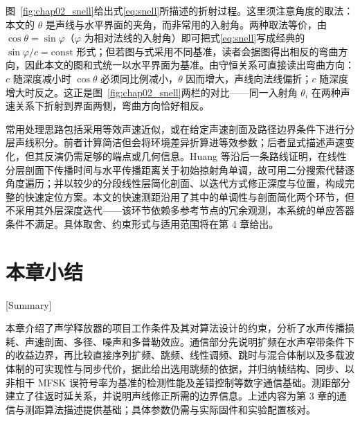 图~\ref{fig:chap02_snell}给出式\eqref{eq:snell}所描述的折射过程。这里须注意角度的取法：本文的 $\theta$ 是声线与水平界面的夹角，而非常用的入射角。两种取法等价，由 $\cos\theta=\sin\varphi$（$\varphi$ 为相对法线的入射角）即可把式\eqref{eq:snell}写成经典的 $\sin\varphi/c=\text{const}$ 形式；但若图与式采用不同基准，读者会据图得出相反的弯曲方向，因此本文的图和式统一以水平界面为基准。由守恒关系可直接读出弯曲方向：$c$ 随深度减小时 $\cos\theta$ 必须同比例减小，$\theta$ 因而增大，声线向法线偏折；$c$ 随深度增大时反之。这正是图~\ref{fig:chap02_snell}两栏的对比——同一入射角 $\theta_i$ 在两种声速关系下折射到界面两侧，弯曲方向恰好相反。

常用处理思路包括采用等效声速近似，或在给定声速剖面及路径边界条件下进行分层声线积分。前者计算简洁但会将环境差异折算进等效参数；后者显式描述声速变化，但其反演仍需足够的端点或几何信息。Huang 等沿后一条路线证明，在线性分层剖面下传播时间与水平传播距离关于初始掠射角单调，故可用二分搜索代替逐角度遍历；并以较少的分段线性层简化剖面、以迭代方式修正深度与位置，构成完整的快速定位方案\cite{huangFastRaytracingbasedPrecise2024}。本文的快速测距沿用了其中的单调性与剖面简化两个环节，但不采用其外层深度迭代——该环节依赖多参考节点的冗余观测，本系统的单应答器条件不满足。具体取舍、约束形式与适用范围将在第 4 章给出\cite{sunRelationshipPropagationTime2019,bergerStratificationEffectCompensation2008}。

\section{本章小结}[Summary]

本章介绍了声学释放器的项目工作条件及其对算法设计的约束，分析了水声传播损耗、声速剖面、多径、噪声和多普勒效应。通信部分先说明扩频在水声窄带条件下的收益边界，再比较直接序列扩频、跳频、线性调频、跳时与混合体制以及多载波体制的可实现性与同步代价，据此给出选用跳频的依据，并归纳帧结构、同步、以非相干 MFSK 误符号率为基准的检测性能及差错控制等数字通信基础。测距部分建立了往返时延关系，并说明声线修正所需的边界信息。上述内容为第 3 章的通信与测距算法描述提供基础；具体参数仍需与实际固件和实验配置核对。
